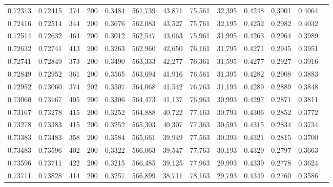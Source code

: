 \begin{tabular}{rrrrrrrrrrrrr}
0.72313 & 0.72415 &    374 & 200 &                                     0.3484 & 561,739 &  43,871 &  75,561 &  32,395 & 0.4248 & 0.3001 & 0.4064 \\
0.72416 & 0.72514 &    344 & 200 &                                     0.3676 & 562,083 &  43,527 &  75,761 &  32,195 & 0.4252 & 0.2982 & 0.4032 \\
0.72514 & 0.72632 &    464 & 200 &                                     0.3012 & 562,547 &  43,063 &  75,961 &  31,995 & 0.4263 & 0.2964 & 0.3989 \\
0.72632 & 0.72741 &    413 & 200 &                                     0.3263 & 562,960 &  42,650 &  76,161 &  31,795 & 0.4271 & 0.2945 & 0.3951 \\
0.72741 & 0.72849 &    373 & 200 &                                     0.3490 & 563,333 &  42,277 &  76,361 &  31,595 & 0.4277 & 0.2927 & 0.3916 \\
0.72849 & 0.72952 &    361 & 200 &                                     0.3565 & 563,694 &  41,916 &  76,561 &  31,395 & 0.4282 & 0.2908 & 0.3883 \\
0.72952 & 0.73060 &    374 & 202 &                                     0.3507 & 564,068 &  41,542 &  76,763 &  31,193 & 0.4289 & 0.2889 & 0.3848 \\
0.73060 & 0.73167 &    405 & 200 &                                     0.3306 & 564,473 &  41,137 &  76,963 &  30,993 & 0.4297 & 0.2871 & 0.3811 \\
0.73167 & 0.73278 &    415 & 200 &                                     0.3252 & 564,888 &  40,722 &  77,163 &  30,793 & 0.4306 & 0.2852 & 0.3772 \\
0.73278 & 0.73383 &    415 & 200 &                                     0.3252 & 565,303 &  40,307 &  77,363 &  30,593 & 0.4315 & 0.2834 & 0.3734 \\
0.73383 & 0.73483 &    358 & 200 &                                     0.3584 & 565,661 &  39,949 &  77,563 &  30,393 & 0.4321 & 0.2815 & 0.3700 \\
0.73483 & 0.73596 &    402 & 200 &                                     0.3322 & 566,063 &  39,547 &  77,763 &  30,193 & 0.4329 & 0.2797 & 0.3663 \\
0.73596 & 0.73711 &    422 & 200 &                                     0.3215 & 566,485 &  39,125 &  77,963 &  29,993 & 0.4339 & 0.2778 & 0.3624 \\
0.73711 & 0.73828 &    414 & 200 &                                     0.3257 & 566,899 &  38,711 &  78,163 &  29,793 & 0.4349 & 0.2760 & 0.3586 \\

\end{tabular}
